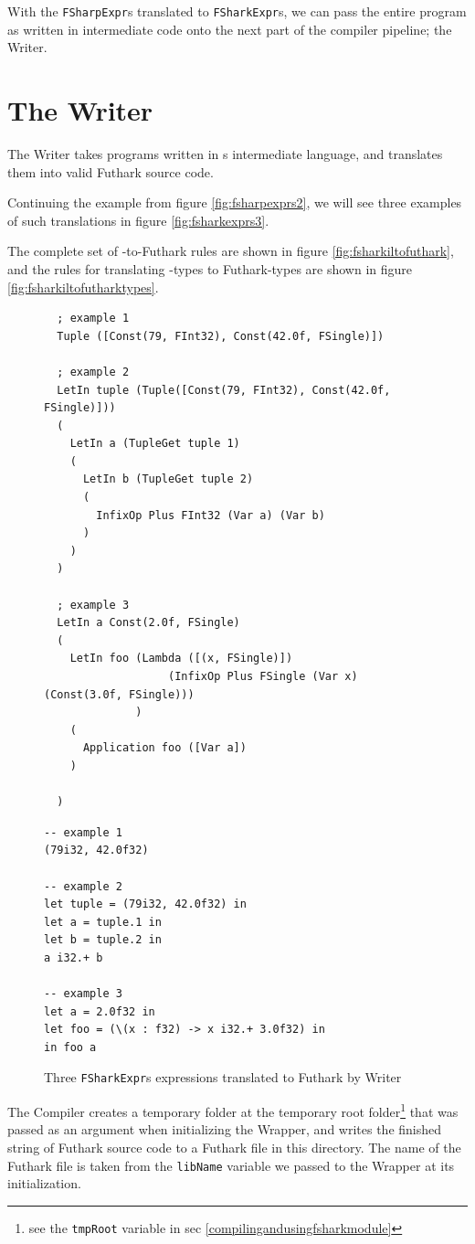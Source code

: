 With the \texttt{FSharpExpr}s translated to \texttt{FSharkExpr}s, we can pass
the entire program as written in \fshark{} intermediate code onto the next part
of the compiler pipeline; the \fshark{}Writer.
\section{The \fshark{}Writer}
The \fshark{}Writer takes programs written in \fshark{}s intermediate language,
and translates them into valid Futhark source code.

Continuing the example from figure \ref{fig:fsharpexprs2}, we will see three
examples of such translations in figure \ref{fig:fsharkexprs3}.

The complete set of \fsharkexpr{}-to-Futhark rules are shown in figure
\ref{fig:fsharkiltofuthark}, and the rules for translating \fsharkil{}-types to
Futhark-types are shown in figure \ref{fig:fsharkiltofutharktypes}.

\begin{figure}[H]
  \centering
\begin{verbatim}
  ; example 1
  Tuple ([Const(79, FInt32), Const(42.0f, FSingle)])

  ; example 2
  LetIn tuple (Tuple([Const(79, FInt32), Const(42.0f, FSingle)]))
  ( 
    LetIn a (TupleGet tuple 1) 
    (
      LetIn b (TupleGet tuple 2) 
      (
        InfixOp Plus FInt32 (Var a) (Var b)
      )       
    )
  )

  ; example 3
  LetIn a Const(2.0f, FSingle)
  (
    LetIn foo (Lambda ([(x, FSingle)]) 
                   (InfixOp Plus FSingle (Var x) (Const(3.0f, FSingle)))
              )
    (
      Application foo ([Var a])
    )

  )
\end{verbatim}
\begin{lstlisting}[language=Futhark]
-- example 1
(79i32, 42.0f32)

-- example 2
let tuple = (79i32, 42.0f32) in
let a = tuple.1 in
let b = tuple.2 in
a i32.+ b

-- example 3
let a = 2.0f32 in
let foo = (\(x : f32) -> x i32.+ 3.0f32) in
in foo a
\end{lstlisting}
  \caption{Three \texttt{FSharkExpr}s expressions translated to Futhark by
    \fshark{}Writer}
  \label{fig:fsharpexprs3}
\end{figure}

The \fshark{}Compiler creates a temporary folder at the temporary root folder\footnote{see the \texttt{tmpRoot} variable in sec \ref{compilingandusingfsharkmodule}}
that was passed as an argument when initializing the \fshark{}Wrapper, and
writes the finished string of Futhark source code to a Futhark file in this
directory.
The name of the Futhark file is taken from the \texttt{libName} variable we
passed to the \fshark{}Wrapper at its initialization.

